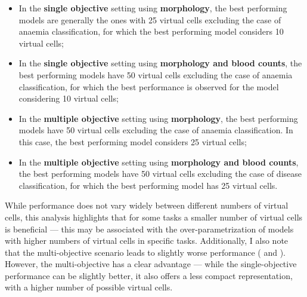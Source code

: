 \begin{itemize}
    \item In the \textbf{single objective} setting using \textbf{morphology}, the best performing models are generally the ones with 25 virtual cells excluding the case of anaemia classification, for which the best performing model considers 10 virtual cells;
    \item In the \textbf{single objective} setting using \textbf{morphology and blood counts}, the best performing models have 50 virtual cells excluding the case of anaemia classification, for which the best performance is observed for the model considering 10 virtual cells;
    \item In the \textbf{multiple objective} setting using \textbf{morphology}, the best performing models have 50 virtual cells excluding the case of anaemia classification. In this case, the best performing model considers 25 virtual cells;
    \item In the \textbf{multiple objective} setting using \textbf{morphology and blood counts}, the best performing models have 50 virtual cells excluding the case of disease classification, for which the best performing model has 25 virtual cells.
\end{itemize}

\begin{figure}[!ht]
    \label{fig:mile-vice-performance}
\end{figure}

While performance does not vary widely between different numbers of virtual cells, this analysis highlights that for some tasks a smaller number of virtual cells is beneficial --- this may be associated with the over-parametrization of models with higher numbers of virtual cells in specific tasks. Additionally, I also note that the multi-objective scenario leads to slightly worse performance ( and ). However, the multi-objective has a clear advantage --- while the single-objective performance can be slightly better, it also offers a less compact representation, with a higher number of possible virtual cells.


